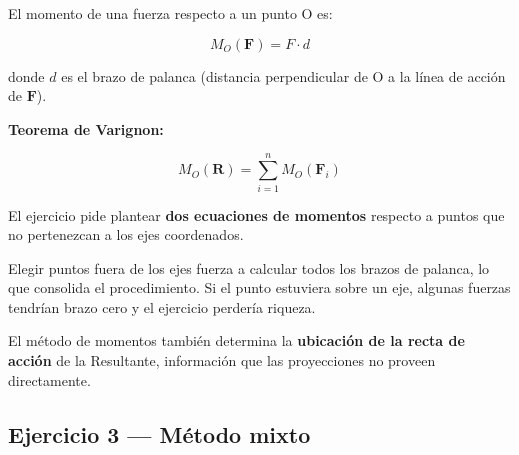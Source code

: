\documentclass[
  spanish,
  11pt,
  a4paper,
]{article}
\begin{document}
El momento de una fuerza respecto a un punto O es:

\[M_O(\mathbf{F}) = F \cdot d\]

donde \(d\) es el brazo de palanca (distancia perpendicular de O a la
línea de acción de \(\mathbf{F}\)).

\textbf{Teorema de Varignon:}

\[M_O(\mathbf{R}) = \sum_{i=1}^{n} M_O(\mathbf{F}_i)\]

El ejercicio pide plantear \textbf{dos ecuaciones de momentos} respecto
a puntos que no pertenezcan a los ejes coordenados.

\begin{tcolorbox}[enhanced jigsaw, bottomrule=.15mm, bottomtitle=1mm, titlerule=0mm, leftrule=.75mm, rightrule=.15mm, title=\textcolor{quarto-callout-tip-color}{\faLightbulb}\hspace{0.5em}{Tip}, coltitle=black, colframe=quarto-callout-tip-color-frame, left=2mm, opacitybacktitle=0.6, opacityback=0, toptitle=1mm, toprule=.15mm, colbacktitle=quarto-callout-tip-color!10!white, colback=white, breakable, arc=.35mm]

Elegir puntos fuera de los ejes fuerza a calcular todos los brazos de
palanca, lo que consolida el procedimiento. Si el punto estuviera sobre
un eje, algunas fuerzas tendrían brazo cero y el ejercicio perdería
riqueza.

\end{tcolorbox}

\begin{tcolorbox}[enhanced jigsaw, bottomrule=.15mm, bottomtitle=1mm, titlerule=0mm, leftrule=.75mm, rightrule=.15mm, title=\textcolor{quarto-callout-note-color}{\faInfo}\hspace{0.5em}{Nota}, coltitle=black, colframe=quarto-callout-note-color-frame, left=2mm, opacitybacktitle=0.6, opacityback=0, toptitle=1mm, toprule=.15mm, colbacktitle=quarto-callout-note-color!10!white, colback=white, breakable, arc=.35mm]

El método de momentos también determina la \textbf{ubicación de la recta
de acción} de la Resultante, información que las proyecciones no proveen
directamente.

\end{tcolorbox}

\subsection{Ejercicio 3 --- Método
mixto}\label{ejercicio-3-muxe9todo-mixto}
\end{document}
